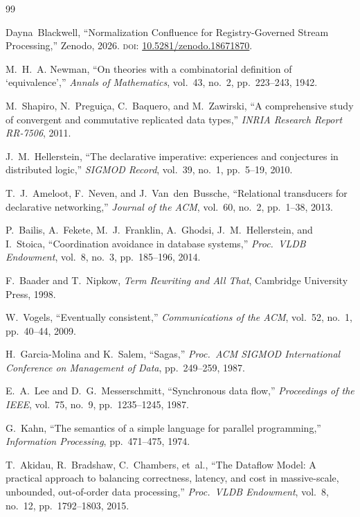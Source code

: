 \documentclass[11pt,a4paper]{article}
\theoremstyle{plain}
\theoremstyle{definition}
\theoremstyle{remark}
\renewcommand{\_}{\textunderscore\allowbreak}
\begin{document}
\begin{thebibliography}{99}

Dayna~Blackwell,
``Normalization Confluence for Registry-Governed Stream Processing,''
Zenodo, 2026.
\textsc{doi}: \href{https://doi.org/10.5281/zenodo.18671870}{10.5281/zenodo.18671870}.

M.~H.~A. Newman,
``On theories with a combinatorial definition of `equivalence',''
\emph{Annals of Mathematics}, vol.~43, no.~2, pp.~223--243, 1942.

M.~Shapiro, N.~Pregui\c{c}a, C.~Baquero, and M.~Zawirski,
``A comprehensive study of convergent and commutative replicated data types,''
\emph{INRIA Research Report RR-7506}, 2011.

J.~M.~Hellerstein,
``The declarative imperative: experiences and conjectures in distributed logic,''
\emph{SIGMOD Record}, vol.~39, no.~1, pp.~5--19, 2010.

T.~J.~Ameloot, F.~Neven, and J.~Van~den~Bussche,
``Relational transducers for declarative networking,''
\emph{Journal of the ACM}, vol.~60, no.~2, pp.~1--38, 2013.

P.~Bailis, A.~Fekete, M.~J.~Franklin, A.~Ghodsi, J.~M.~Hellerstein, and I.~Stoica,
``Coordination avoidance in database systems,''
\emph{Proc.\ VLDB Endowment}, vol.~8, no.~3, pp.~185--196, 2014.

F.~Baader and T.~Nipkow,
\emph{Term Rewriting and All That},
Cambridge University Press, 1998.

W.~Vogels,
``Eventually consistent,''
\emph{Communications of the ACM}, vol.~52, no.~1, pp.~40--44, 2009.

H.~Garcia-Molina and K.~Salem,
``Sagas,''
\emph{Proc.\ ACM SIGMOD International Conference on Management of Data}, pp.~249--259, 1987.

E.~A.~Lee and D.~G.~Messerschmitt,
``Synchronous data flow,''
\emph{Proceedings of the IEEE}, vol.~75, no.~9, pp.~1235--1245, 1987.

G.~Kahn,
``The semantics of a simple language for parallel programming,''
\emph{Information Processing}, pp.~471--475, 1974.

T.~Akidau, R.~Bradshaw, C.~Chambers, et~al.,
``The Dataflow Model: A practical approach to balancing correctness, latency, and cost in massive-scale, unbounded, out-of-order data processing,''
\emph{Proc.\ VLDB Endowment}, vol.~8, no.~12, pp.~1792--1803, 2015.


\end{thebibliography}
\end{document}
